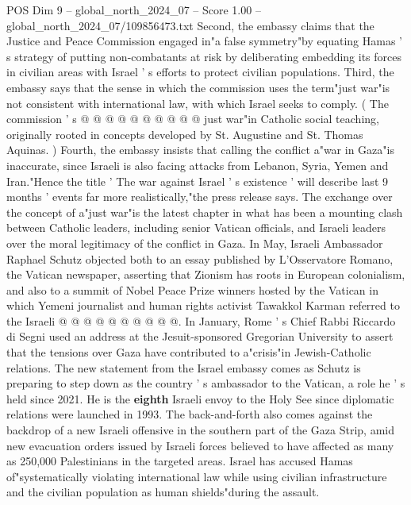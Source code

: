 \begin{textsample}{POS Dim 9 – global\_north\_2024\_07 – Score 1.00 – global\_north\_2024\_07/109856473.txt}
Second, the embassy claims that the Justice and Peace Commission engaged in"a false symmetry"by equating Hamas ' s strategy of putting non-combatants at risk by deliberating embedding its forces in civilian areas with Israel ' s efforts to protect civilian populations.
Third, the embassy says that the sense in which the commission uses the term"just war"is not consistent with international law, with which Israel seeks to comply. ( The commission ' s @ @ @ @ @ @ @ @ @ @ just war"in Catholic social teaching, originally rooted in concepts developed by St.
Augustine and St.
Thomas Aquinas. ) Fourth, the embassy insists that calling the conflict a"war in Gaza"is inaccurate, since Israeli is also facing attacks from Lebanon, Syria, Yemen and Iran."Hence the title ' The war against Israel ' s existence ' will describe last 9 months ' events far more realistically,"the press release says.
The exchange over the concept of a"just war"is the latest chapter in what has been a mounting clash between Catholic leaders, including senior Vatican officials, and Israeli leaders over the moral legitimacy of the conflict in Gaza.
In May, Israeli Ambassador Raphael Schutz objected both to an essay published by L'Osservatore Romano, the Vatican newspaper, asserting that Zionism has roots in European colonialism, and also to a summit of Nobel Peace Prize winners hosted by the Vatican in which Yemeni journalist and human rights activist Tawakkol Karman referred to the Israeli @ @ @ @ @ @ @ @ @ @.
In January, Rome ' s Chief Rabbi Riccardo di Segni used an address at the Jesuit-sponsored Gregorian University to assert that the tensions over Gaza have contributed to a"crisis"in Jewish-Catholic relations.
The new statement from the Israel embassy comes as Schutz is preparing to step down as the country ' s ambassador to the Vatican, a role he ' s held since 2021.
He is the \textbf{eighth} Israeli envoy to the Holy See since diplomatic relations were launched in 1993.
The back-and-forth also comes against the backdrop of a new Israeli offensive in the southern part of the Gaza Strip, amid new evacuation orders issued by Israeli forces believed to have affected as many as 250,000 Palestinians in the targeted areas.
Israel has accused Hamas of"systematically violating international law while using civilian infrastructure and the civilian population as human shields"during the assault.

\end{textsample}

